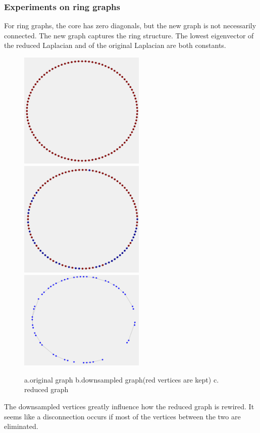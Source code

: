 \documentclass[a4paper]{article}
\begin{document}
\subsubsection{Experiments on ring graphs}
For ring graphs, the core has zero diagonals, but the new graph is not necessarily connected. The new graph captures the ring structure. The lowest eigenvector of the reduced Laplacian and of the original Laplacian are both constants.
\begin{figure}[H]
\centering

\includegraphics[width = 6cm]{ring_graph/ring_graph}
\includegraphics[width = 6cm]{ring_graph/ring_graph_downsample}
\includegraphics[width = 6cm]{ring_graph/ring_graph_reduced}

\caption{a.original graph b.downsampled graph(red vertices are kept) c. reduced graph}
\end{figure}


The downsampled vertices greatly influence how the reduced graph is rewired. It seems like a disconnection occurs if most of the vertices between the two are eliminated.
\end{document}
